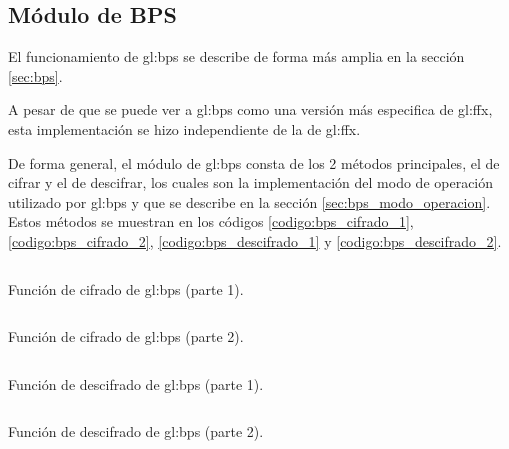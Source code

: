 %
%
%

%
\subsection{Módulo de BPS}

El funcionamiento de \gls{gl:bps} se describe de forma más amplia en la sección
\ref{sec:bps}.


A pesar de que se puede ver a \gls{gl:bps} como una versión más especifica de
\gls{gl:ffx}, esta implementación se hizo independiente de la de \gls{gl:ffx}.

De forma general, el módulo de \gls{gl:bps} consta de los 2 métodos principales,
el de cifrar y el de descifrar, los cuales son la implementación del modo de
operación utilizado por \gls{gl:bps} y que se describe en la sección
\ref{sec:bps_modo_operacion}. Estos métodos se muestran en los códigos
\ref{codigo:bps_cifrado_1}, \ref{codigo:bps_cifrado_2},
\ref{codigo:bps_descifrado_1} y \ref{codigo:bps_descifrado_2}.


\begin{listing}
  \inputminted[firstline=77, lastline=116]
    {c++}{../implementaciones/bps/cifrador_BPS.cpp}
  \caption{Función de cifrado de \gls{gl:bps} (parte 1).}
  \label{codigo:bps_cifrado_1}
\end{listing}

\begin{listing}
  \inputminted[firstline=116, lastline=156]
    {c++}{../implementaciones/bps/cifrador_BPS.cpp}
  \caption{Función de cifrado de \gls{gl:bps} (parte 2).}
  \label{codigo:bps_cifrado_2}
\end{listing}

\begin{listing}
  \inputminted[firstline=158, lastline=198]
    {c++}{../implementaciones/bps/cifrador_BPS.cpp}
  \caption{Función de descifrado de \gls{gl:bps} (parte 1).}
  \label{codigo:bps_descifrado_1}
\end{listing}

\begin{listing}
  \inputminted[firstline=198, lastline=250]
    {c++}{../implementaciones/bps/cifrador_BPS.cpp}
  \caption{Función de descifrado de \gls{gl:bps} (parte 2).}
  \label{codigo:bps_descifrado_2}
\end{listing}

